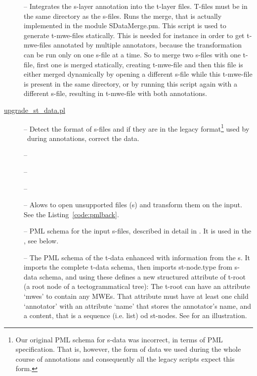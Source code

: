 \begin{description}

\item [] -- Integrates the s-layer annotation into the t-layer files. T-files must be in the same directory as the s-files. Runs the merge, that is actually implemented in the module SDataMerge.pm. This script is used to generate t-mwe-files statically. This is needed for instance in order to get t-mwe-files annotated by multiple annotators, because the transformation can be run only on one s-file at a time. So to merge two s-files with one t-file, first one is merged statically, creating t-mwe-file and then this file is either merged dynamically by opening a different s-file while this t-mwe-file is present in the same directory, or by running this script again with a different s-file, resulting in t-mwe-file with both annotations.

\item [\url{upgrade_st_data.pl}] -- Detect the format of s-files and if they are in the legacy format\footnote{%
Our original PML schema for s-data was incorrect, in terms of PML specification. That is, however, the form of data we used during the whole course of annotations and consequently all the legacy scripts expect this form.}%
 used by \seman\ during annotations, correct the data. 

\item [] -- \todo

\item [] -- \todo

\item [] -- \todo

\item [] -- Alows to open unsupported files (\stf{}s) and transform them on the input. See the Listing~\ref{code:pmlback}.

\item [] -- PML schema for the input s-files, described in detail in . It is used in the , see below. 

\item [] -- The PML schema of the t-data enhanced with information from the \sf{}s. It imports the complete t-data schema, then imports st-node.type from s-data schema, and using these defines a new structured attribute of t-root (a root node of a tectogrammatical tree): The t-root can have an attribute `mwes' to contain any MWEs. That attribute must have at least one child `annotator' with an attribute `name' that stores the annotator's name, and a content, that is a sequence (i.e. list) od st-nodes. See  for an illustration.\todo

\end{description}


